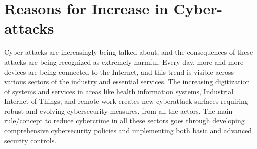 \documentclass[journal]{IEEEtran}
\begin{document}
%




\section{Reasons for Increase in Cyber-attacks}

Cyber attacks are increasingly being talked about, and the consequences of these attacks are being recognized as extremely harmful. Every day, more and more devices are being connected to the Internet, and this trend is visible across various sectors of the industry and essential services.
The increasing digitization of systems and services in areas like health information systems, Industrial Internet of Things, and remote work creates new cyberattack surfaces requiring robust and evolving cybersecurity measures, from all the actors. The main rule/concept to reduce cybercrime in all these sectors goes through  developing comprehensive cybersecurity policies and implementing both basic and advanced security controls. 
\end{document}
